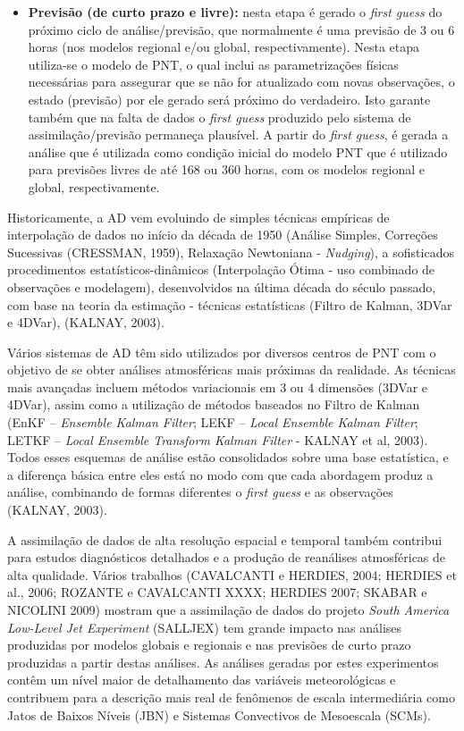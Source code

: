 \begin{itemize}
\item \textbf{Previsão (de curto prazo e livre):} nesta etapa é gerado o \textit{first guess} do próximo ciclo de análise/previsão, que normalmente é uma previsão de 3 ou 6 horas (nos modelos regional e/ou global, respectivamente). Nesta etapa utiliza-se o modelo de PNT, o qual inclui as parametrizações físicas necessárias para assegurar que se não for atualizado com novas observações, o estado (previsão) por ele gerado será próximo do verdadeiro. Isto garante também que na falta de dados o \textit{first guess} produzido pelo sistema de assimilação/previsão permaneça plausível. A partir do \textit{first guess}, é gerada a análise que é utilizada como condição inicial do modelo PNT que é utilizado para previsões livres de até 168 ou 360 horas, com os modelos regional e global, respectivamente.
\end{itemize}

Historicamente, a AD vem evoluindo de simples técnicas empíricas de interpolação de dados no início da década de 1950 (Análise Simples, Correções Sucessivas (CRESSMAN, 1959), Relaxação Newtoniana - \textit{Nudging}), a sofisticados procedimentos estatísticos-dinâmicos (Interpolação Ótima - uso combinado de observações e modelagem), desenvolvidos na última década do século passado, com base na teoria da estimação - técnicas estatísticas (Filtro de Kalman, 3DVar e 4DVar), (KALNAY, 2003).

Vários sistemas de AD têm sido utilizados por diversos centros de PNT com o objetivo de se obter análises atmosféricas mais próximas da realidade. As técnicas mais avançadas incluem métodos variacionais em 3 ou 4 dimensões (3DVar e 4DVar), assim como a utilização de métodos baseados no Filtro de Kalman (EnKF – \textit{Ensemble Kalman Filter}; LEKF – \textit{Local Ensemble Kalman Filter}; LETKF – \textit{Local Ensemble Transform Kalman Filter} - KALNAY et al, 2003). Todos esses esquemas de análise estão consolidados sobre uma base estatística, e a diferença básica entre eles está no modo com que cada abordagem produz a análise, combinando de formas diferentes o \textit{first guess} e as observações (KALNAY, 2003).

A assimilação de dados de alta resolução espacial e temporal também contribui para estudos diagnósticos detalhados e a produção de reanálises atmosféricas de alta qualidade. Vários trabalhos (CAVALCANTI e HERDIES, 2004; HERDIES et al., 2006; ROZANTE e CAVALCANTI XXXX; HERDIES 2007; SKABAR e NICOLINI 2009) mostram que a assimilação de dados do projeto \textit{South America Low-Level Jet Experiment} (SALLJEX) tem grande impacto nas análises produzidas por modelos globais e regionais e nas previsões de curto prazo produzidas a partir destas análises. As análises geradas por estes experimentos contêm um nível maior de detalhamento das variáveis meteorológicas e contribuem para a descrição mais real de fenômenos de escala intermediária como Jatos de Baixos Níveis (JBN) e Sistemas Convectivos de Mesoescala (SCMs). 

